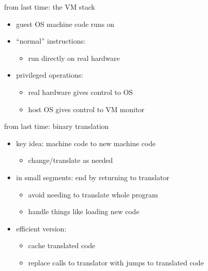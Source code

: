 \begin{frame}{from last time: the VM stack}
    \begin{itemize}
    \item guest OS machine code runs on 
    \item ``normal'' instructions:
        \begin{itemize}
        \item run directly on real hardware
        \end{itemize}
    \item privileged operations:
        \begin{itemize}
        \item real hardware gives control to  OS
        \item host OS gives control to VM monitor
        \end{itemize}
    \end{itemize}
\end{frame}

\begin{frame}{from last time: binary translation}
    \begin{itemize}
    \item key idea: machine code to new machine code
        \begin{itemize}
        \item change/translate as needed
        \end{itemize}
    \item in small segments: end by returning to translator
        \begin{itemize}
        \item avoid needing to translate whole program
        \item handle things like loading new code
        \end{itemize}
    \item efficient version:
        \begin{itemize}
        \item cache translated code
        \item replace calls to translator with jumps to translated code
        \end{itemize}
    \end{itemize}
\end{frame}


